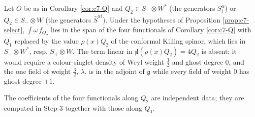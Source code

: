 \begin{corollary}
\label{cor:c7-S}
Let $O$ be as in Corollary \ref{cor:c7-Q} and $Q_2\in S_+\otimes W^*$ (the generators $S^\alpha_i$) or $Q_2\in S_-\otimes W$ (the generators $\bar S^{\dot\alpha i}$). Under the hypotheses of Proposition \ref{prop:c7-select}, $\int\omega\,f_{Q_2}$ lies in the span of the four functionals of Corollary \ref{cor:c7-Q} with $Q_1$ replaced by the value $\rho(x)Q_2$ of the conformal Killing spinor, which lies in $S_-\otimes W^*$, resp. $S_+\otimes W$. The term linear in ${\not d}(\rho(x)Q_2)=4Q_2$ is absent: it would require a colour-singlet density of Weyl weight $\tfrac32$ and ghost degree $0$, and the one field of weight $\tfrac32$, $\lambda$, is in the adjoint of $\mathfrak g$ while every field of weight $0$ has ghost degree $+1$.
\end{corollary}

The coefficients of the four functionals along $Q_2$ are independent data; they are computed in Step 3 together with those along $Q_1$.


